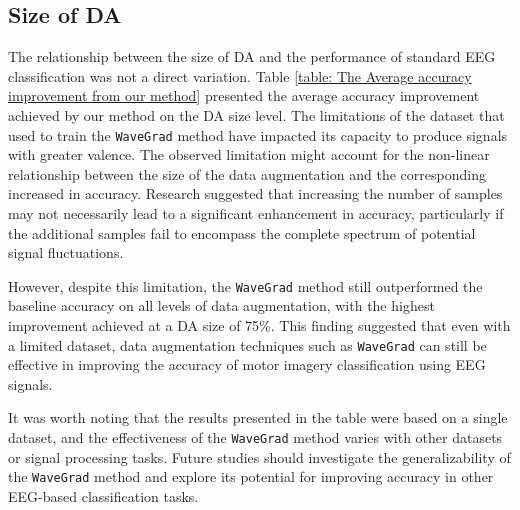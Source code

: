 \documentclass[runningheads]{llncs}
\begin{document}

\subsection{Size of DA}
 The relationship between the size of DA and the performance of standard EEG classification was not a direct variation. Table \ref{table: The Average accuracy improvement from our method} presented the average accuracy improvement achieved by our method on the DA size level. The limitations of the dataset that used to train the \texttt{WaveGrad} method have impacted its capacity to produce signals with greater valence. The observed limitation might account for the non-linear relationship between the size of the data augmentation and the corresponding increased in accuracy. Research suggested that increasing the number of samples may not necessarily lead to a significant enhancement in accuracy, particularly if the additional samples fail to encompass the complete spectrum of potential signal fluctuations.


However, despite this limitation, the \texttt{WaveGrad} method still outperformed the baseline accuracy on all levels of data augmentation, with the highest improvement achieved at a DA size of 75\%. This finding suggested that even with a limited dataset, data augmentation techniques such as \texttt{WaveGrad} can still be effective in improving the accuracy of motor imagery classification using EEG signals.

It was worth noting that the results presented in the table were based on a single dataset, and the effectiveness of the \texttt{WaveGrad} method varies with other datasets or signal processing tasks. Future studies should investigate the generalizability of the \texttt{WaveGrad} method and explore its potential for improving accuracy in other EEG-based classification tasks.
\end{document}
